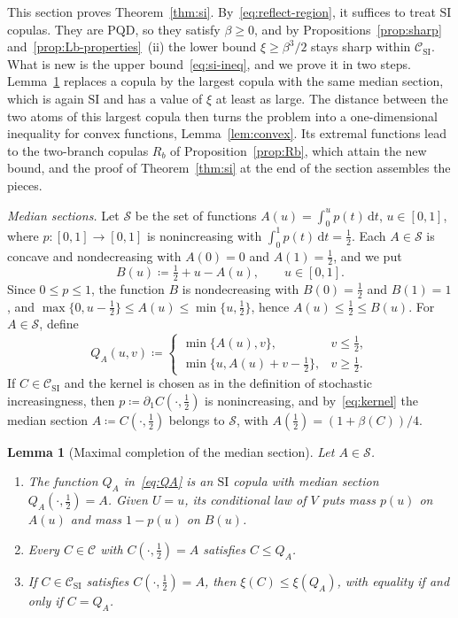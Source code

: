\documentclass[twocolumn,a4paper]{article}
\numberwithin{equation}{section}
\newtheorem{lemma}[theorem]{Lemma}
\theoremstyle{remark}
\newcommand{\CC}{\mathcal{C}}
\newcommand{\1}{\mathbf{1}}
\newcommand{\de}{\,\mathrm{d}}
\newcommand{\PQD}{\mathrm{PQD}}
\newcommand{\SI}{\mathrm{SI}}
\begin{document}
This section proves Theorem~\ref{thm:si}.
By~\eqref{eq:reflect-region}, it suffices to treat \(\SI\) copulas.
They are \(\PQD\), so they satisfy \(\beta\ge0\), and by Propositions~\ref{prop:sharp} and~\ref{prop:Lb-properties}~(ii) the lower bound \(\xi\ge\beta^3/2\) stays sharp within \(\CC_{\SI}\).
What is new is the upper bound~\eqref{eq:si-ineq}, and we prove it in two steps.
Lemma~\ref{lem:completion} replaces a copula by the largest copula with the same median section, which is again \(\SI\) and has a value of \(\xi\) at least as large.
The distance between the two atoms of this largest copula then turns the problem into a one-dimensional inequality for convex functions, Lemma~\ref{lem:convex}.
Its extremal functions lead to the two-branch copulas \(R_b\) of Proposition~\ref{prop:Rb}, which attain the new bound, and the proof of Theorem~\ref{thm:si} at the end of the section assembles the pieces.

\emph{Median sections.}
Let \(\mathcal S\) be the set of functions \(A(u)=\int_0^up(t)\de t\), \(u\in[0,1]\), where \(p\colon[0,1]\to[0,1]\) is nonincreasing with \(\int_0^1p(t)\de t=\tfrac12\).
Each \(A\in\mathcal S\) is concave and nondecreasing with \(A(0)=0\) and \(A(1)=\tfrac12\), and we put
\[
B(u)\coloneqq\tfrac12+u-A(u),\qquad u\in[0,1].
\]
Since \(0\le p\le1\), the function \(B\) is nondecreasing with \(B(0)=\tfrac12\) and \(B(1)=1\), and \(\max\{0,u-\tfrac12\}\le A(u)\le\min\{u,\tfrac12\}\), hence \(A(u)\le\tfrac12\le B(u)\).
For \(A\in\mathcal S\), define
\begin{equation}\label{eq:QA}
Q_A(u,v)\coloneqq
\begin{cases}
\min\{A(u),v\},&v\le\tfrac12,\\
\min\{u,A(u)+v-\tfrac12\},&v\ge\tfrac12.
\end{cases}
\end{equation}
If \(C\in\CC_{\SI}\) and the kernel is chosen as in the definition of stochastic increasingness, then \(p\coloneqq\partial_1C(\cdot,\tfrac12)\) is nonincreasing, and by~\eqref{eq:kernel} the median section \(A\coloneqq C(\cdot,\tfrac12)\) belongs to \(\mathcal S\), with \(A(\tfrac12)=(1+\beta(C))/4\).

\begin{lemma}[Maximal completion of the median section]\label{lem:completion}
Let \(A\in\mathcal S\).
\begin{enumerate}[label=\textup{(\roman*)},leftmargin=*]
\item The function \(Q_A\) in~\eqref{eq:QA} is an \(\SI\) copula with median section \(Q_A(\cdot,\tfrac12)=A\).
Given \(U=u\), its conditional law of \(V\) puts mass \(p(u)\) on \(A(u)\) and mass \(1-p(u)\) on \(B(u)\).
\item Every \(C\in\CC\) with \(C(\cdot,\tfrac12)=A\) satisfies \(C\le Q_A\).
\item If \(C\in\CC_{\SI}\) satisfies \(C(\cdot,\tfrac12)=A\), then \(\xi(C)\le\xi(Q_A)\), with equality if and only if \(C=Q_A\).
\end{enumerate}
\end{lemma}
\end{document}
